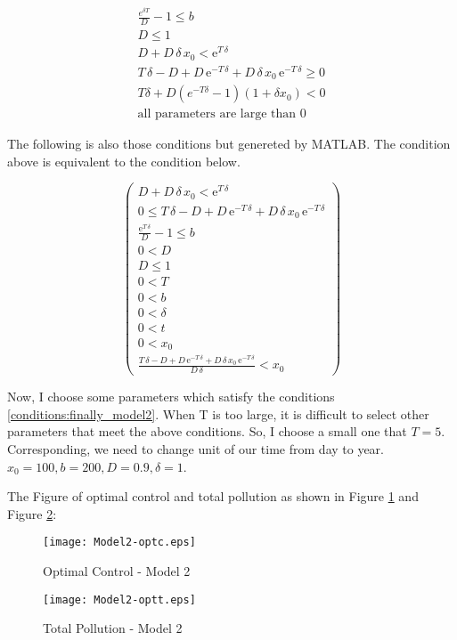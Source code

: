 \begin{equation}\label{conditions:finally_model2}
    \begin{split}
        \frac{e^{\delta T}}{D}-1\leq b\\
        D\leq 1\\
        D+D\,\delta \,x_{0}<{\mathrm{e}}^{T\,\delta }\\
        T\,\delta -D+D\,{\mathrm{e}}^{-T\,\delta }+D\,\delta \,x_{0}\,{\mathrm{e}}^{-T\,\delta }\geq 0\\
        T\delta+D(e^{-T\delta}-1)(1+\delta x_0)<0\\
        \text{all parameters are large than 0}
    \end{split}
\end{equation}

The following is also those conditions but genereted by MATLAB. The condition above is equivalent to the condition below.

\begin{equation}
\left(\begin{array}{ccccccccccc} D+D\,\delta \,x_{0}<{\mathrm{e}}^{T\,\delta } \\ 0\leq T\,\delta -D+D\,{\mathrm{e}}^{-T\,\delta }+D\,\delta \,x_{0}\,{\mathrm{e}}^{-T\,\delta } \\ \frac{{\mathrm{e}}^{T\,\delta }}{D}-1\leq b \\ 0<D \\ D\leq 1 \\ 0<T \\ 0<b \\ 0<\delta  \\ 0<t \\ 0<x_{0} \\ \frac{T\,\delta -D+D\,{\mathrm{e}}^{-T\,\delta }+D\,\delta \,x_{0}\,{\mathrm{e}}^{-T\,\delta }}{D\,\delta }<x_{0} \end{array}\right)
\end{equation}

Now, I choose some parameters which satisfy the conditions \eqref{conditions:finally_model2}. When T is too large, it is difficult to select other parameters that meet the above conditions. So, I choose a small one that $T=5$. Corresponding, we need to change unit of our time from  day to year. $x_0=100, b=200, D=0.9, \delta=1 $.

The Figure of optimal control and total pollution as shown in Figure \ref{fig:model2_optc} and Figure \ref{fig:model2_optt}:


\begin{figure}[!ht]
    \centering
    \texttt{[image: Model2-optc.eps]}
    \caption{Optimal Control - Model 2}
    \label{fig:model2_optc}
\end{figure}


\begin{figure}[!ht]
    \centering
    \texttt{[image: Model2-optt.eps]}
    \caption{Total Pollution - Model 2}
    \label{fig:model2_optt}
\end{figure}
